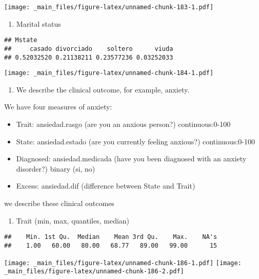 \documentclass[
]{book}
\providecommand{\tightlist}{%
  \setlength{\itemsep}{0pt}\setlength{\parskip}{0pt}}
\begin{document}
\texttt{[image: \_main\_files/figure-latex/unnamed-chunk-183-1.pdf]}

\begin{enumerate}
\def\labelenumi{\alph{enumi}.}
\setcounter{enumi}{3}
\tightlist
\item
  Marital status
\end{enumerate}

\begin{verbatim}
## Mstate
##     casado divorciado    soltero      viuda 
## 0.52032520 0.21138211 0.23577236 0.03252033
\end{verbatim}

\texttt{[image: \_main\_files/figure-latex/unnamed-chunk-184-1.pdf]}

\begin{enumerate}
\def\labelenumi{\arabic{enumi}.}
\setcounter{enumi}{1}
\tightlist
\item
  We describe the clinical outcome, for example, anxiety.
\end{enumerate}

We have four measures of anxiety:

\begin{itemize}
\tightlist
\item
  Trait: ansiedad.rasgo (are you an anxious person?) continuous:0-100
\item
  State: ansiedad.estado (are you currently feeling anxious?) continuous:0-100
\item
  Diagnosed: ansiedad.medicada (have you been diagnosed with an anxiety disorder?) binary (si, no)
\item
  Excess: ansiedad.dif (difference between State and Trait)
\end{itemize}

we describe these clinical outcomes

\begin{enumerate}
\def\labelenumi{\alph{enumi}.}
\tightlist
\item
  Trait (min, max, quantiles, median)
\end{enumerate}

\begin{verbatim}
##    Min. 1st Qu.  Median    Mean 3rd Qu.    Max.    NA's 
##    1.00   60.00   80.00   68.77   89.00   99.00      15
\end{verbatim}

\texttt{[image: \_main\_files/figure-latex/unnamed-chunk-186-1.pdf]} \texttt{[image: \_main\_files/figure-latex/unnamed-chunk-186-2.pdf]}
\end{document}

